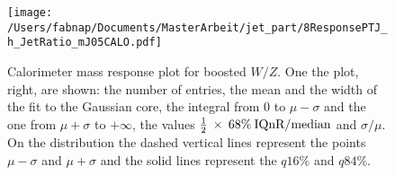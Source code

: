 \begin{figure}[!ht]
  \centering
      \texttt{[image: /Users/fabnap/Documents/MasterArbeit/jet\_part/8ResponsePTJ\_h\_JetRatio\_mJ05CALO.pdf]}
  \caption[$\mcal$ response single $\pt$ bin]{Calorimeter mass response plot for boosted $W/Z$. One the plot, right, are shown: the number of entries, the mean and the width of the fit to the Gaussian core, the integral from 0 to $\mu-\sigma$ and the one from $\mu+\sigma$ to $+\infty$, the values $\frac{1}{2}\: \times\: 68\% \:\textrm{IQnR/median}$ and $\sigma/\mu$. On the distribution the dashed vertical lines represent the points $\mu-\sigma$ and $\mu+\sigma$ and the solid lines represent the $q16\%$ and $q84\%$.}
  \label{fig:iqrbin}
\end{figure}